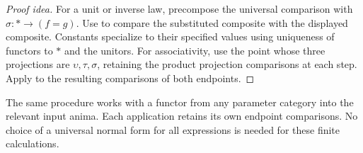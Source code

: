 \documentclass[11pt]{article}
\begin{document}
\begin{proof}[Proof idea]
For a unit or inverse law, precompose the universal comparison with
$\sigma\colon *\to(f=g)$. Use
 to compare the substituted
composite with the displayed composite. Constants specialize to their
specified values using uniqueness of functors to $*$ and the unitors.
For associativity, use the point whose three projections are
$\upsilon,\tau,\sigma$, retaining the product projection comparisons at
each step. Apply  to the
resulting comparisons of both endpoints.
\end{proof}

The same procedure works with a functor from any parameter category into
the relevant input anima. Each application retains its own endpoint
comparisons. No choice of a universal normal form for all expressions is
needed for these finite calculations.
\end{document}
